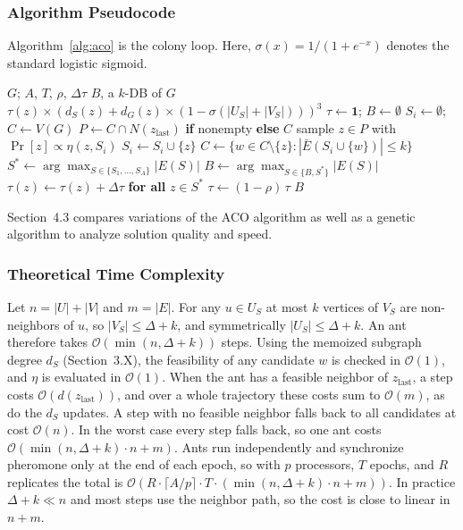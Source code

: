 \documentclass[conference]{IEEEtran}
\begin{document}
\subsubsection{Algorithm Pseudocode}

Algorithm~\ref{alg:aco} is the colony loop. Here, $\sigma(x) = 1/(1+e^{-x})$ denotes the standard logistic sigmoid.

\begin{algorithm}[H]
\caption{ACO for $k$-MDB}
\label{alg:aco}
\begin{algorithmic}[1]
   \Require $G$; $A$, $T$, $\rho$, $\Delta\tau$
   \Ensure $B$, a $k$-DB of $G$
       \State \Return $\tau(z) \times (d_S(z) + d_G(z) \times (1 - \sigma(|U_S| + |V_S|)))^3$
   \EndFunction
   \State $\tau \gets \mathbf{1}$; $B \gets \emptyset$
       \State $S_i \gets \emptyset$; $C \gets V(G)$
           \State $P \gets C \cap N(z_{\mathrm{last}})$ \textbf{if} nonempty \textbf{else} $C$
           \State sample $z \in P$ with $\Pr[z] \propto \eta(z, S_i)$
           \State $S_i \gets S_i \cup \{z\}$
           \State $C \gets \{w \in C \setminus \{z\} : |\bar E(S_i \cup \{w\})| \le k\}$
       \EndWhile
       \EndFor
       \State $S^* \gets \arg\max_{S \in \{S_1,\dots,S_A\}} |E(S)|$
       \State $B \gets \arg\max_{S \in \{B, S^*\}} |E(S)|$
       \State $\tau(z) \gets \tau(z) + \Delta\tau$ \textbf{for all} $z \in S^*$
       \State $\tau \gets (1-\rho)\,\tau$
   \EndFor
   \State \Return $B$
\end{algorithmic}
\end{algorithm}

Section~4.3 compares variations of the ACO algorithm as well as a genetic algorithm to analyze solution quality and speed.

\subsubsection{Theoretical Time Complexity}

Let $n = |U| + |V|$ and $m = |E|$. For any $u \in U_S$ at most $k$ vertices of $V_S$ are non-neighbors of $u$, so $|V_S| \le \Delta + k$, and symmetrically $|U_S| \le \Delta + k$. An ant therefore takes $\mathcal{O}(\min(n, \Delta + k))$ steps. Using the memoized subgraph degree $d_S$ (Section~3.X), the feasibility of any candidate $w$ is checked in $\mathcal{O}(1)$, and $\eta$ is evaluated in $\mathcal{O}(1)$. When the ant has a feasible neighbor of $z_{\text{last}}$, a step costs $\mathcal{O}(d(z_{\text{last}}))$, and over a whole trajectory these costs sum to $\mathcal{O}(m)$, as do the $d_S$ updates. A step with no feasible neighbor falls back to all candidates at cost $\mathcal{O}(n)$. In the worst case every step falls back, so one ant costs $\mathcal{O}(\min(n, \Delta + k) \cdot n + m)$. Ants run independently and synchronize pheromone only at the end of each epoch, so with $p$ processors, $T$ epochs, and $R$ replicates the total is $\mathcal{O}(R \cdot \lceil A/p \rceil \cdot T \cdot (\min(n, \Delta + k) \cdot n + m))$. In practice $\Delta + k \ll n$ and most steps use the neighbor path, so the cost is close to linear in $n + m$.
\end{document}
